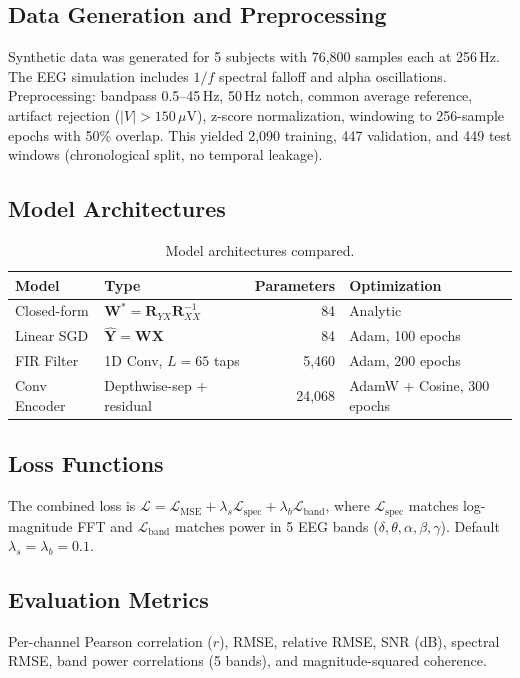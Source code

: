 \documentclass[11pt,a4paper]{article}
\begin{document}
\subsection{Data Generation and Preprocessing}
Synthetic data was generated for 5 subjects with 76,800 samples each at 256\,Hz.
The EEG simulation includes $1/f$ spectral falloff and alpha oscillations.
Preprocessing: bandpass 0.5--45\,Hz, 50\,Hz notch, common average reference,
artifact rejection ($|V| > 150\,\mu$V), z-score normalization, windowing to
256-sample epochs with 50\% overlap. This yielded 2,090 training, 447 validation,
and 449 test windows (chronological split, no temporal leakage).

\subsection{Model Architectures}

\begin{table}[H]
\centering
\caption{Model architectures compared.}
\label{tab:models}
\begin{tabular}{llrl}
\toprule
Model & Type & Parameters & Optimization \\
\midrule
Closed-form & $\mathbf{W}^* = \mathbf{R}_{YX}\mathbf{R}_{XX}^{-1}$ & 84 & Analytic \\
Linear SGD & $\hat{\mathbf{Y}} = \mathbf{W}\mathbf{X}$ & 84 & Adam, 100 epochs \\
FIR Filter & 1D Conv, $L{=}65$ taps & 5,460 & Adam, 200 epochs \\
Conv Encoder & Depthwise-sep + residual & 24,068 & AdamW + Cosine, 300 epochs \\
\bottomrule
\end{tabular}
\end{table}

\subsection{Loss Functions}
The combined loss is $\mathcal{L} = \mathcal{L}_\text{MSE} + \lambda_s \mathcal{L}_\text{spec}
+ \lambda_b \mathcal{L}_\text{band}$, where $\mathcal{L}_\text{spec}$ matches
log-magnitude FFT and $\mathcal{L}_\text{band}$ matches power in 5 EEG bands
($\delta, \theta, \alpha, \beta, \gamma$). Default $\lambda_s = \lambda_b = 0.1$.

\subsection{Evaluation Metrics}
Per-channel Pearson correlation ($r$), RMSE, relative RMSE, SNR (dB),
spectral RMSE, band power correlations (5 bands), and magnitude-squared coherence.
\end{document}
